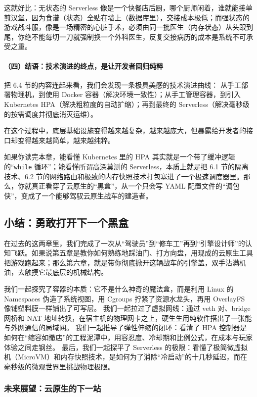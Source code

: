 这就好比：无状态的 Serverless 像是一个快餐店后厨，哪个厨师闲着，谁就能接单煎汉堡，因为食谱（状态）全贴在墙上（数据库里），交接成本极低；而强状态的游戏战斗服，像是一场精密的心脏手术，必须由同一批医生（内存状态）从头跟到尾，你绝不能每切一刀就强制换一个外科医生，反复交接病历的成本是系统不可承受之重。

\paragraph{（四）结语：技术演进的终点，是让开发者回归纯粹}

把 6.4 节的内容连起来看，我们会发现一条极具美感的技术演进曲线：
从手工部署物理机，到使用 Docker 容器（解决环境一致性）；从手工管理容器，到引入 Kubernetes HPA（解决粗粒度的自动扩缩）；再到最终的 Serverless（解决毫秒级的按需调度并彻底消灭运维）。

在这个过程中，底层基础设施变得越来越复杂，越来越庞大，但暴露给开发者的接口却变得越来越简单，越来越纯粹。

如果你读完本章，能看懂 Kubernetes 里的 HPA 其实就是一个带了缓冲逻辑的“\texttt{while} 循环”；能看懂所谓高深莫测的 Serverless，本质上就是把 6.1 节的隔离技术、6.2 节的网络路由和极致的内存快照技术打包塞进了一个极速调度器里。那么，你就真正看穿了云原生的“黑盒”，从一个只会写 YAML 配置文件的“调包侠”，变成了一个能够驾驭云原生战车的建造者。

\subsection{小结：勇敢打开下一个黑盒}

在过去的这两章里，我们完成了一次从“驾驶员”到“修车工”再到“引擎设计师”的认知飞跃。如果说第五章是教你如何熟练地踩油门、打方向盘，用现成的云原生工具把游戏跑起来；那么第六章，就是带你彻底掀开这辆战车的引擎盖，双手沾满机油，去触摸它最底层的机械结构。

我们一起探究了容器的本质：它不是什么神奇的魔法盒，而是利用 Linux 的 Namespaces 伪造了系统视图，用 Cgroups 拧紧了资源水龙头，再用 OverlayFS 像铺塑料膜一样铺出了可写层。
我们一起拉过了虚拟网线：通过 veth 对、bridge 网桥和 NAT 地址转换，在宿主机的物理网卡之上，硬生生用纯软件搭出了一张能与外网通信的局域网。
我们一起推导了弹性伸缩的闭环：看清了 HPA 控制器是如何在“缩容如撤店”的工程泥潭中，用容忍度、冷却期和比例公式，在成本与玩家体验之间走钢丝。
最后，我们一起探平了 Serverless 的极限：看懂了极简微虚拟机（MicroVM）和内存快照技术，是如何为了消除“冷启动”的十几秒延迟，而在毫秒级的微观世界里挑战物理极限。

\subsubsection{未来展望：云原生的下一站}

